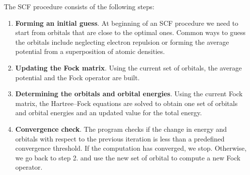 \documentclass[../Main/chem371-notes.tex]{subfiles}
\begin{document}
The SCF procedure consists of the following steps:
\begin{enumerate}
\item \textbf{Forming an initial guess}. At beginning of an SCF procedure we need to start from orbitals that are close to the optimal ones.
Common ways to guess the orbitals include neglecting electron repulsion or forming the average potential from a superposition of atomic densities.
\item \textbf{Updating the Fock matrix}. Using the current set of orbitals, the average potential and the Fock operator are built. 
\item \textbf{Determining the orbitals and orbital energies}. Using the current Fock matrix, the Hartree--Fock equations are solved to obtain one set of orbitals and orbital energies and an updated value for the total energy.
\item \textbf{Convergence check}. The program checks if the change in energy and orbitals with respect to the previous iteration is less than a predefined convergence threshold. If the computation has converged, we stop. Otherwise, we go back to step 2. and use the new set of orbital to compute a new Fock operator.
\end{enumerate}
\end{document}
